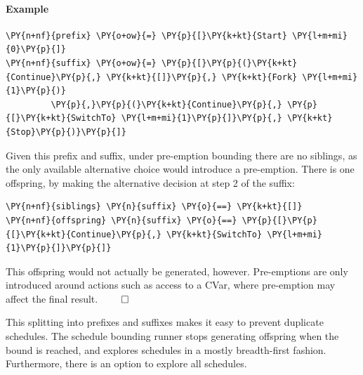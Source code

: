 \begin{justspacing}
\paragraph{Example}


\begin{Verbatim}[commandchars=\\\{\}]
\PY{n+nf}{prefix} \PY{o+ow}{=} \PY{p}{[}\PY{k+kt}{Start} \PY{l+m+mi}{0}\PY{p}{]}
\PY{n+nf}{suffix} \PY{o+ow}{=} \PY{p}{[}\PY{p}{(}\PY{k+kt}{Continue}\PY{p}{,} \PY{k+kt}{[]}\PY{p}{,} \PY{k+kt}{Fork} \PY{l+m+mi}{1}\PY{p}{)}
         \PY{p}{,}\PY{p}{(}\PY{k+kt}{Continue}\PY{p}{,} \PY{p}{[}\PY{k+kt}{SwitchTo} \PY{l+m+mi}{1}\PY{p}{]}\PY{p}{,} \PY{k+kt}{Stop}\PY{p}{)}\PY{p}{]}
\end{Verbatim}

Given this prefix and suffix, under pre-emption bounding there are no
siblings, as the only available alternative choice would introduce a
pre-emption. There is one offspring, by making the alternative
decision at step 2 of the suffix:


\begin{Verbatim}[commandchars=\\\{\}]
\PY{n+nf}{siblings} \PY{n}{suffix} \PY{o}{==} \PY{k+kt}{[]}
\PY{n+nf}{offspring} \PY{n}{suffix} \PY{o}{==} \PY{p}{[}\PY{p}{[}\PY{k+kt}{Continue}\PY{p}{,} \PY{k+kt}{SwitchTo} \PY{l+m+mi}{1}\PY{p}{]}\PY{p}{]}
\end{Verbatim}

This offspring would not actually be generated, however. Pre-emptions
are only introduced around actions such as access to a CVar, where
pre-emption may affect the final result. \hfill $\qed$
\end{justspacing}

This splitting into prefixes and suffixes makes it easy to prevent
duplicate schedules. The schedule bounding runner stops generating
offspring when the bound is reached, and explores schedules in a
mostly breadth-first fashion. Furthermore, there is an option to
explore all schedules.

